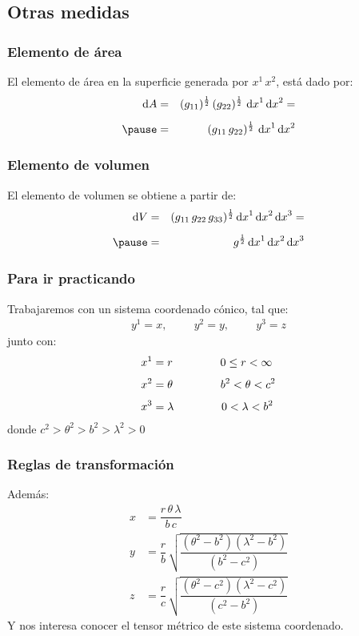 \documentclass[12pt]{beamer}
\begin{document}
\subsection{Otras medidas}

\begin{frame}
\frametitle{Elemento de área}
El elemento de área en la superficie generada por $x^{1} \, x^{2}$, está dado por:
\pause
\begin{eqnarray*}
\dd{A} &=& (g_{11})^{\frac{1}{2}} \, (g_{22})^{\frac{1}{2}} \, \dd{x}^{1} \dd{x}^{2} = \\[0.5em] \pause 
&=& (g_{11} \, g_{22})^{\frac{1}{2}} \, \dd{x}^{1} \dd{x}^{2}
\end{eqnarray*}
\end{frame}
\begin{frame}
\frametitle{Elemento de volumen}
El elemento de volumen se obtiene a partir de:
\begin{eqnarray*}
\dd{V} &=& (g_{11} \, g_{22} \, g_{33})^{\frac{1}{2}} \dd{x}^{1} \dd{x}^{2} \dd{x}^{3} = \\[0.5em] \pause
&=& g^{\frac{1}{2}} \dd{x}^{1} \dd{x}^{2} \dd{x}^{3}
\end{eqnarray*}
\end{frame}
\begin{frame}
\frametitle{Para ir practicando}
Trabajaremos con un sistema coordenado cónico, tal que:
\pause
\begin{align*}
y^{1} = x, \hspace{1cm} y^{2} = y, \hspace{1cm} y^{3} = z
\end{align*}
\pause
junto con:
\begin{align*}
x^{1} &= r \hspace{1.5cm} 0 \leq r < \infty \\[0.35em]
x^{2} &= \theta \hspace{1.5cm} b^{2} < \theta < c^{2} \\[0.35em]
x^{3} &= \lambda \hspace{1.5cm} 0 < \lambda < b^{2}
\end{align*}
donde $c^{2} > \theta^{2} > b^{2} > \lambda^{2} > 0$
\end{frame}
\begin{frame}
\frametitle{Reglas de transformación}
Además:
\begin{align*}
x &= \dfrac{r \, \theta \, \lambda}{b \, c} \\[0.5em]
y &= \dfrac{r}{b} \, \sqrt{\dfrac{(\theta^{2} - b^{2})(\lambda^{2} - b^{2})}{(b^{2} - c^{2})}} \\[0.5em]
z &= \dfrac{r}{c} \, \sqrt{\dfrac{(\theta^{2} - c^{2})(\lambda^{2} - c^{2})}{(c^{2} - b^{2})}}
\end{align*}
\pause
Y nos interesa conocer el tensor métrico de este sistema coordenado.
\end{frame}
\end{document}

